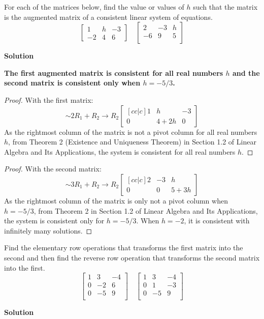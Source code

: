 \documentclass[11pt]{scrartcl}
\theoremstyle{dotlessP}
\theoremstyle{dotlessN}
\begin{document}
\begin{ques}
	For each of the matrices below, find the value or values of $h$ such that the matrix is the augmented matrix of a consistent linear system of equations.
\[
	\begin{bmatrix}
		1 & h & -3 \\
		-2 & 4 & 6
	\end{bmatrix} \quad 
	\begin{bmatrix}
		2 & -3 & h \\
		-6 & 9 & 5 \\
	\end{bmatrix}
\] 	
\end{ques}
\textbf{Solution}

	\textbf{The first augmented matrix is consistent for all real numbers $h$ and the second matrix is consistent only when $h = -5/3$.}
	\begin{proof}
		With the first matrix:
		\[
			\sim 2R_1 + R_2 \to R_2
			\begin{bmatrix}[cc|c]
				1 & h & -3 \\
				0 & 4 + 2h & 0 
			\end{bmatrix}
		\]
 As the rightmost column of the matrix is not a pivot column for all real numbers $h$, from Theorem 2 (Existence and Uniqueness Theorem) in Section 1.2 of Linear Algebra and Its Applications, the system is consistent for all real numbers $h$.
	\end{proof}
	\begin{proof}
		With the second matrix:
		\[
			\sim 3R_1 + R_2 \to R_2
			\begin{bmatrix}[cc|c]
				2 & -3 & h \\
				0 & 0 & 5 + 3h 
			\end{bmatrix}
		\]
 As the rightmost column of the matrix is only not a pivot column when $h = -5/3$, from Theorem 2 in Section 1.2 of Linear Algebra and Its Applications, the system is consistent only for $h = -5/3$. When $h=-2$, it is consistent with infinitely many solutions.
	\end{proof}
\begin{ques}
	Find the elementary row operations that transforms the first matrix into the second and then find the reverse row operation that transforms the second matrix into the first.
\[
\begin{bmatrix}	
	1 & 3 & -4 \\
	0 & -2 & 6 \\
	0 & -5 & 9 \\ 
\end{bmatrix} \quad
\begin{bmatrix}
	1 & 3 & -4 \\
	0 & 1 & -3 \\
	0 & -5 & 9 \\
\end{bmatrix}
\] 	
\end{ques}
\textbf{Solution}
\end{document}
